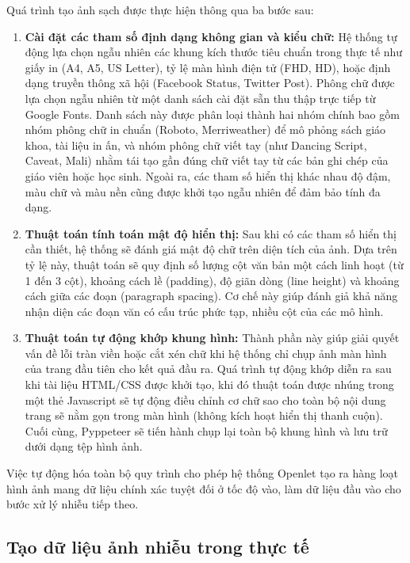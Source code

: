Quá trình tạo ảnh sạch được thực hiện thông qua ba bước sau:

\begin{enumerate}
    \item \textbf{Cài đặt các tham số định dạng không gian và kiểu chữ:} Hệ thống tự động lựa chọn ngẫu nhiên các khung kích thước tiêu chuẩn trong thực tế như giấy in (A4, A5, US Letter), tỷ lệ màn hình điện tử (FHD, HD), hoặc định dạng truyền thông xã hội (Facebook Status, Twitter Post). Phông chữ được lựa chọn ngẫu nhiên từ một danh sách cài đặt sẵn thu thập trực tiếp từ Google Fonts. Danh sách này được phân loại thành hai nhóm chính bao gồm nhóm phông chữ in chuẩn (Roboto, Merriweather) để mô phỏng sách giáo khoa, tài liệu in ấn, và nhóm phông chữ viết tay (như Dancing Script, Caveat, Mali) nhằm tái tạo gần đúng chữ viết tay từ các bản ghi chép của giáo viên hoặc học sinh. Ngoài ra, các tham số hiển thị khác nhau độ đậm, màu chữ và màu nền cũng được khởi tạo ngẫu nhiên để đảm bảo tính đa dạng.

    \item \textbf{Thuật toán tính toán mật độ hiển thị:} Sau khi có các tham số hiển thị cần thiết, hệ thống sẽ đánh giá mật độ chữ trên diện tích của ảnh. Dựa trên tỷ lệ này, thuật toán sẽ quy định số lượng cột văn bản một cách linh hoạt (từ 1 đến 3 cột), khoảng cách lề (padding), độ giãn dòng (line height) và khoảng cách giữa các đoạn (paragraph spacing). Cơ chế này giúp đánh giả khả năng nhận diện các đoạn văn có cấu trúc phức tạp, nhiều cột của các mô hình.

    \item \textbf{Thuật toán tự động khớp khung hình:} Thành phần này giúp giải quyết vấn đề lỗi tràn viền hoặc cắt xén chữ khi hệ thống chỉ chụp ảnh màn hình của trang đầu tiên cho kết quả đầu ra. Quá trình tự động khớp diễn ra sau khi tài liệu HTML/CSS được khởi tạo, khi đó thuật toán được nhúng trong một thẻ Javascript sẽ tự động điều chỉnh cơ chữ sao cho toàn bộ nội dung trang sẽ nằm gọn trong màn hình (không kích hoạt hiển thị thanh cuộn). Cuối cùng, Pyppeteer sẽ tiến hành chụp lại toàn bộ khung hình và lưu trữ dưới dạng tệp hình ảnh.
    
\end{enumerate}

Việc tự động hóa toàn bộ quy trình cho phép hệ thống Openlet tạo ra hàng loạt hình ảnh mang dữ liệu chính xác tuyệt đối ở tốc độ vào, làm dữ liệu đầu vào cho bước xử lý nhiễu tiếp theo.

\subsection{Tạo dữ liệu ảnh nhiễu trong thực tế}


